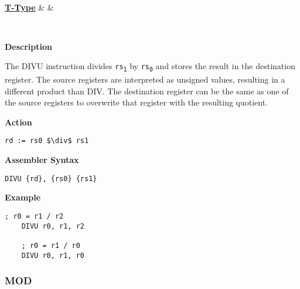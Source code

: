 \vspace{3ex}

\begin{center}
	\begin{bytefield}[leftcurly=., leftcurlyspace=0pt]{32}
		 \\
		\begin{leftwordgroup}{\hyperref[sec:t-type]{\textbf{T-Type}}}
		 & 
		 &
		\end{leftwordgroup}\\
	\end{bytefield}
\end{center}

\textbf{Description}

The DIVU instruction divides \texttt{rs\textsubscript{1}} by \texttt{rs\textsubscript{0}} and stores the result in the destination register.
The source registers are interpreted as unsigned values, resulting in a different product than DIV.
The destination register can be the same as one of the source registers to overwrite that register with the resulting quotient.
\vspace{3ex}

\textbf{Action}
\begin{lstlisting}[frame=single]
	rd := rs0 $\div$ rs1
\end{lstlisting}

\vspace{3ex}

\textbf{Assembler Syntax}
\begin{lstlisting}[frame=single]
	DIVU {rd}, {rs0} {rs1}
\end{lstlisting}

\vspace{3ex}

\textbf{Example}
\begin{lstlisting}[frame=single]
	; r0 = r1 / r2
	DIVU r0, r1, r2
	
	; r0 = r1 / r0
	DIVU r0, r1, r0
\end{lstlisting}

\subsubsection{MOD }\label{sec:MOD}

\vspace{3ex}

